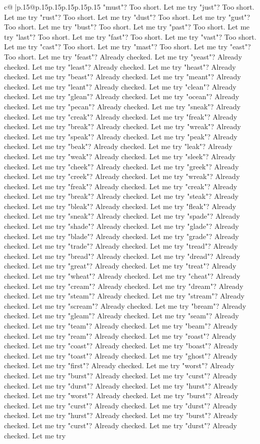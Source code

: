 \documentclass{article}
\begin{document}
{\begin{supertabular}{c@{$\;$}|p{.15\linewidth}@{}p{.15\linewidth}p{.15\linewidth}p{.15\linewidth}p{.15\linewidth}p{.15\linewidth}}
{{{"must"? Too short. Let me try "just"? Too short. Let me try "rust"? Too short. Let me try "dust"? Too short. Let me try "gust"? Too short. Let me try "bust"? Too short. Let me try "past"? Too short. Let me try "last"? Too short. Let me try "fast"? Too short. Let me try "vast"? Too short. Let me try "cast"? Too short. Let me try "mast"? Too short. Let me try "east"? Too short. Let me try "feast"? Already checked. Let me try "yeast"? Already checked. Let me try "least"? Already checked. Let me try "heast"? Already checked. Let me try "beast"? Already checked. Let me try "meant"? Already checked. Let me try "leant"? Already checked. Let me try "clean"? Already checked. Let me try "glean"? Already checked. Let me try "ocean"? Already checked. Let me try "pecan"? Already checked. Let me try "sneak"? Already checked. Let me try "creak"? Already checked. Let me try "freak"? Already checked. Let me try "break"? Already checked. Let me try "wreak"? Already checked. Let me try "speak"? Already checked. Let me try "peak"? Already checked. Let me try "beak"? Already checked. Let me try "leak"? Already checked. Let me try "weak"? Already checked. Let me try "sleek"? Already checked. Let me try "cheek"? Already checked. Let me try "greek"? Already checked. Let me try "creek"? Already checked. Let me try "wreak"? Already checked. Let me try "freak"? Already checked. Let me try "creak"? Already checked. Let me try "break"? Already checked. Let me try "steak"? Already checked. Let me try "bleak"? Already checked. Let me try "fleak"? Already checked. Let me try "sneak"? Already checked. Let me try "spade"? Already checked. Let me try "shade"? Already checked. Let me try "glade"? Already checked. Let me try "blade"? Already checked. Let me try "grade"? Already checked. Let me try "trade"? Already checked. Let me try "tread"? Already checked. Let me try "bread"? Already checked. Let me try "dread"? Already checked. Let me try "great"? Already checked. Let me try "treat"? Already checked. Let me try "wheat"? Already checked. Let me try "cheat"? Already checked. Let me try "cream"? Already checked. Let me try "dream"? Already checked. Let me try "steam"? Already checked. Let me try "stream"? Already checked. Let me try "scream"? Already checked. Let me try "bream"? Already checked. Let me try "gleam"? Already checked. Let me try "seam"? Already checked. Let me try "team"? Already checked. Let me try "beam"? Already checked. Let me try "ream"? Already checked. Let me try "roast"? Already checked. Let me try "coast"? Already checked. Let me try "boast"? Already checked. Let me try "toast"? Already checked. Let me try "ghost"? Already checked. Let me try "first"? Already checked. Let me try "worst"? Already checked. Let me try "burst"? Already checked. Let me try "curst"? Already checked. Let me try "durst"? Already checked. Let me try "hurst"? Already checked. Let me try "worst"? Already checked. Let me try "burst"? Already checked. Let me try "curst"? Already checked. Let me try "durst"? Already checked. Let me try "hurst"? Already checked. Let me try "burst"? Already checked. Let me try "curst"? Already checked. Let me try "durst"? Already checked. Let me try }}}
\end{supertabular}}
\end{document}
